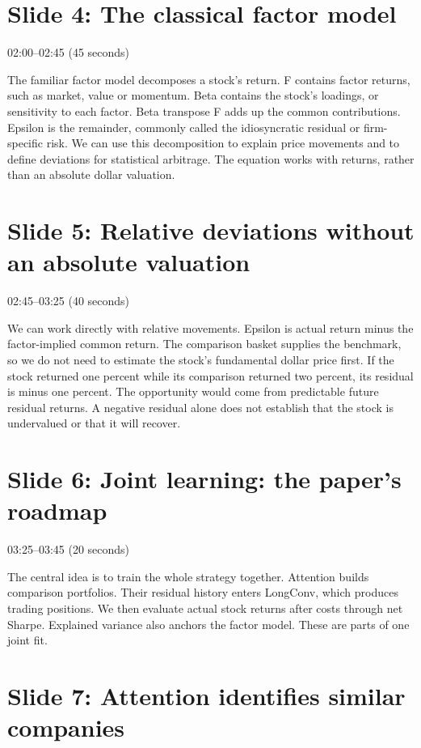 \documentclass[11pt]{article}
\begin{document}
\section*{Slide 4: The classical factor model}

\textcolor{SBred}{02:00--02:45 (45 seconds)}

The familiar factor model decomposes a stock's return. F contains factor returns, such as market, value or momentum. Beta contains the stock's loadings, or sensitivity to each factor. Beta transpose F adds up the common contributions. Epsilon is the remainder, commonly called the idiosyncratic residual or firm-specific risk. We can use this decomposition to explain price movements and to define deviations for statistical arbitrage. The equation works with returns, rather than an absolute dollar valuation.

\section*{Slide 5: Relative deviations without an absolute valuation}

\textcolor{SBred}{02:45--03:25 (40 seconds)}

We can work directly with relative movements. Epsilon is actual return minus the factor-implied common return. The comparison basket supplies the benchmark, so we do not need to estimate the stock's fundamental dollar price first. If the stock returned one percent while its comparison returned two percent, its residual is minus one percent. The opportunity would come from predictable future residual returns. A negative residual alone does not establish that the stock is undervalued or that it will recover.

\section*{Slide 6: Joint learning: the paper's roadmap}

\textcolor{SBred}{03:25--03:45 (20 seconds)}

The central idea is to train the whole strategy together. Attention builds comparison portfolios. Their residual history enters LongConv, which produces trading positions. We then evaluate actual stock returns after costs through net Sharpe. Explained variance also anchors the factor model. These are parts of one joint fit.

\section*{Slide 7: Attention identifies similar companies}
\end{document}
